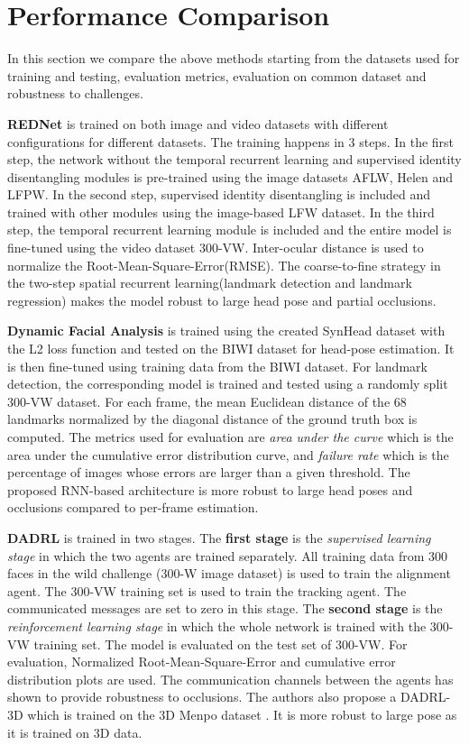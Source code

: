 \documentclass{llncs}
\begin{document}
\section{Performance Comparison}
In this section we compare the above methods starting from the datasets used for training and testing, evaluation metrics, evaluation on common dataset and robustness to challenges.

\textbf{REDNet} \cite{rednet} is trained on both image and video datasets with different configurations for different datasets. The training happens in 3 steps. In the first step, the network without the temporal recurrent learning and supervised identity disentangling modules is pre-trained using the image datasets AFLW, Helen and LFPW. In the second step, supervised identity disentangling is included and trained with other modules using the image-based LFW dataset. In the third step, the temporal recurrent learning module is included and the entire model is fine-tuned using the video dataset 300-VW. Inter-ocular distance is used to normalize the Root-Mean-Square-Error(RMSE).
The coarse-to-fine strategy in the two-step spatial recurrent learning(landmark detection and landmark regression) makes the model robust to large head pose and partial occlusions. 

\textbf{Dynamic Facial Analysis} \cite{dynamic_facial_analysis} is trained using the created SynHead dataset with the L2 loss function and tested on the BIWI dataset for head-pose estimation. It is then fine-tuned using training data from the BIWI dataset. For landmark detection, the corresponding model is trained and tested using a randomly split 300-VW dataset. For each frame, the mean Euclidean distance of the 68 landmarks normalized by the diagonal distance of the ground truth box is computed. The metrics used for evaluation are \textit{area under the curve} which is the area under the cumulative error distribution curve, and \textit{failure rate} which is the percentage of images whose errors are larger than a given threshold. The proposed RNN-based architecture is more robust to large head poses and occlusions  compared to per-frame estimation. 

\textbf{DADRL} \cite{dadrl} is trained in two stages. The \textbf{first stage} is the \textit{supervised learning stage} in which the two agents are trained separately. All training data from 300 faces in the wild challenge (300-W image dataset) is used to train the alignment agent. The 300-VW training set is used to train the tracking agent. The communicated messages are set to zero in this stage. The \textbf{second stage} is the \textit{reinforcement learning stage} in which the whole network is trained with the 300-VW training set. The model is evaluated on the test set of 300-VW. For evaluation, Normalized Root-Mean-Square-Error and cumulative error distribution plots are used. The communication channels between the agents has shown to provide robustness to occlusions. The authors also propose a DADRL-3D which is trained on the 3D Menpo dataset \cite{3d_menpo}. It is more robust to large pose as it is trained on 3D data.
\end{document}
